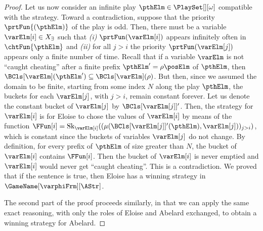 \documentclass[authoryear]{elsarticle}
\newcommand{\VarX}[1][]{{X_{#1}}}
\newcommand{\choiceFunBucket}{\mu}
\newcommand{\SkolemizedSOF}{\text{Sk}}
\begin{document}
\begin{proof}
  Let us now consider an infinite play $\pthElm \in \PlaySet[][\omega]$
  compatible with the strategy. Toward a contradiction, suppose that the
  priority $\prtFun{(\pthElm)}$ of the play is odd.  Then, there must be a
  variable $\varElm[i] \in \VarX[\exists]$ such that \emph{(i)}
  $\prtFun(\varElm[i])$ appears infinitely often in $\chtFun{\pthElm}$ and
  \emph{(ii)} for all $j > i$ the priority $\prtFun(\varElm[j])$ appears only a
  finite number of time.
%
  Recall that if a variable $\varElm$ is not ``caught cheating'' after a finite
  prefix $\pthElm' = \rho \posElm$ of $\pthElm$, then
  $\BCls[{\varElm}](\pthElm') \subseteq \BCls[{\varElm}](\rho)$.
  But then, since we assumed the domain to be finite,
  starting from some index $N$ along the play $\pthElm$, the buckets for each
  $\varElm[j]$, with $j > i$, remain constant forever.
  Let us denote the constant bucket of $\varElm[j]$ by
  $\BCls[{\varElm[j]}]'$. Then, the strategy for $\varElm[i]$ is for Eloise to
  chose the values of $\varElm[i]$ by means of the function $\FFun[i] =
  \SkolemizedSOF_{\varElm[i]}((\choiceFunBucket(\BCls[{\varElm[j]}]'(\pthElm),
  \varElm[j]))_{j>i})$, which is constant since the buckets of variables
  $\varElm[j]$ do not change. By definition, for every prefix of $\pthElm$ of
  size greater than $N$, the bucket of $\varElm[i]$ contains $\FFun[i]$. Then
  the bucket of $\varElm[i]$ is never emptied and $\varElm[i]$ would never get
  ``caught cheating''.
  This is a contradiction.
  We proved that if the sentence is true, then Eloise has a winning strategy in
  $\GameName[\varphiFrm][\AStr]$.

  The second part of the proof proceeds similarly, in that we can apply the same
  exact reasoning, with only the roles of Eloise and Abelard exchanged, to
  obtain a winning strategy for Abelard.


\end{proof}





  \newpage
  \footnotesize
  
  
\end{document}
